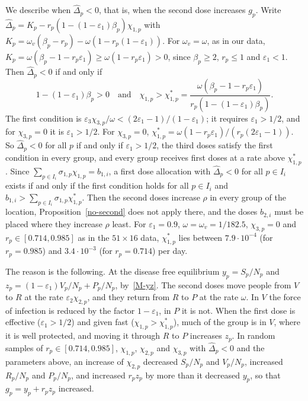 \begin{remark}
We describe when $\widehat\Delta_p<0$, that is, when the second dose increases $g_p$.
Write $\widehat\Delta_p=K_p-r_p\left(1-(1-\varepsilon_1)\beta_p\right)\chi_{1,p}$ with
$K_p=\omega_v(\beta_p-r_p)-\omega\left(1-r_p(1-\varepsilon_1)\right)$. For
$\omega_v=\omega$, as in our data,
$K_p=\omega\left(\beta_p-1-r_p\varepsilon_1\right)\ge\omega\left(1-r_p\varepsilon_1\right)>0$,
since $\beta_p\ge 2$, $r_p\le 1$ and $\varepsilon_1<1$. Then $\widehat\Delta_p<0$ if and
only if
\begin{equation*}
1-(1-\varepsilon_1)\beta_p>0\quad\mbox{and}\quad
\chi_{1,p}>\chi_{1,p}^*=\frac{\omega\left(\beta_p-1-r_p\varepsilon_1\right)}{r_p\left(1-(1-\varepsilon_1)\beta_p\right)}.
\end{equation*}
The first condition is
$\varepsilon_3\chi_{3,p}/\omega<(2\varepsilon_1-1)/(1-\varepsilon_1)$; it requires
$\varepsilon_1>1/2$, and for $\chi_{3,p}=0$ it is $\varepsilon_1>1/2$. For
$\chi_{3,p}=0$,
$\chi_{1,p}^*=\omega\left(1-r_p\varepsilon_1\right)/\left(r_p(2\varepsilon_1-1)\right)$.
So $\widehat\Delta_p<0$ for all $p$ if and only if $\varepsilon_1>1/2$, the third doses
satisfy the first condition in every group, and every group receives first
doses at a rate above $\chi_{1,p}^*$. Since
$\sum_{p\in I_i}\sigma_{1,p}\chi_{1,p}=b_{1,i}$, a first dose allocation with
$\widehat\Delta_p<0$ for all $p\in I_i$ exists if and only if the first condition holds
for all $p\in I_i$ and
$b_{1,i}>\sum_{p\in I_i}\sigma_{1,p}\chi_{1,p}^*$. Then the second doses
increase $\rho$ in every group of the location, Proposition~\ref{no-second}
does not apply there, and the doses $b_{2,i}$ must be placed where they
increase $\rho$ least. For $\varepsilon_1=0.9$, $\omega=\omega_v=1/182.5$,
$\chi_{3,p}=0$ and $r_p\in[0.714,0.985]$ as in the $51\times16$ data,
$\chi_{1,p}^*$ lies between $7.9\cdot10^{-4}$ (for $r_p=0.985$) and
$3.4\cdot10^{-3}$ (for $r_p=0.714$) per day.

The reason is the following. At the disease free equilibrium $y_p=S_p/N_p$ and
$z_p=(1-\varepsilon_1)V_p/N_p+P_p/N_p$, by~\eqref{M-yz}. The second doses move
people from $V$ to $R$ at the rate $\varepsilon_2\chi_{2,p}$, and they return
from $R$ to $P$ at the rate $\omega$. In $V$ the force of infection is reduced
by the factor $1-\varepsilon_1$, in $P$ it is not. When the first dose is
effective ($\varepsilon_1>1/2$) and given fast ($\chi_{1,p}>\chi_{1,p}^*$),
much of the group is in $V$, where it is well protected, and moving it through
$R$ to $P$ increases $z_p$. In random samples of $r_p\in[0.714,0.985]$,
$\chi_{1,p}$, $\chi_{2,p}$ and $\chi_{3,p}$ with $\widehat\Delta_p<0$ and the parameters
above, an increase of $\chi_{2,p}$ decreased $S_p/N_p$ and $V_p/N_p$, increased
$R_p/N_p$ and $P_p/N_p$, and increased $r_pz_p$ by more than it decreased
$y_p$, so that $g_p=y_p+r_pz_p$ increased.
\end{remark}

